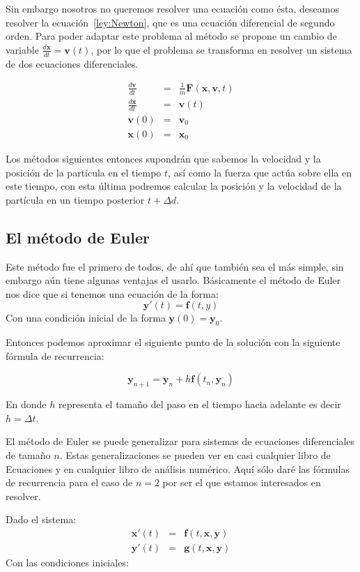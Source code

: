 Sin embargo nosotros no queremos resolver una ecuación como ésta, deseamos resolver la ecuación~\eqref{ley:Newton}, que es una ecuación diferencial de segundo orden.
Para poder adaptar este problema al método se propone un cambio de variable $\frac{d\textbf{x}}{dt} = \textbf{v}(t)$, por lo que el problema se transforma en resolver un sistema de dos ecuaciones diferenciales.

\begin{eqnarray}
\frac{d\textbf{v}}{dt} & = & \frac{1}{m} \textbf{F}(\textbf{x}, \textbf{v}, t) \nonumber \\
\frac{d\textbf{x}}{dt} & = & \textbf{v}(t) \nonumber \\
\textbf{v}(0) & = & \textbf{v}_0 \nonumber \\
\textbf{x}(0) & = & \textbf{x}_0 \nonumber
\end{eqnarray}

Los métodos siguientes entonces supondrán que sabemos la velocidad y la posición de la partícula en el tiempo $t$, así como la fuerza que actúa sobre ella en este tiempo, con esta última podremos calcular la posición y la velocidad de la partícula en un tiempo posterior $t + \Delta d$.

\subsection{El método de Euler}
Este método fue el primero de todos, de ahí que también sea el más simple, sin embargo aún tiene algunas ventajas el usarlo.
Básicamente el método de Euler nos dice que si tenemos una ecuación de la forma:
$$\textbf{y}'(t) = \textbf{f}(t, y)$$
Con una condición inicial de la forma $\textbf{y}(0)=\textbf{y}_0$.

Entonces podemos aproximar el siguiente punto de la solución con la siguiente fórmula de recurrencia:

$$\textbf{y}_{n+1} = \textbf{y}_n + h\textbf{f}(t_n, \textbf{y}_n)$$

En donde $h$ representa el tamaño del paso en el tiempo hacia adelante es decir $h = \Delta t$.

El método de Euler se puede generalizar para sistemas de ecuaciones diferenciales de tamaño $n$.
Estas generalizaciones se pueden ver en casi cualquier libro de Ecuaciones y en cualquier libro de análisis numérico.
Aquí sólo daré las fórmulas de recurrencia para el caso de $n=2$ por ser el que estamos interesados en resolver.

Dado el sistema:
\begin{eqnarray}
\textbf{x}'(t) & = & \textbf{f}(t, \textbf{x}, \textbf{y}) \nonumber \\
\textbf{y}'(t) & = & \textbf{g}(t, \textbf{x}, \textbf{y})
\label{sistema:general}
\end{eqnarray}
Con las condiciones iniciales:

